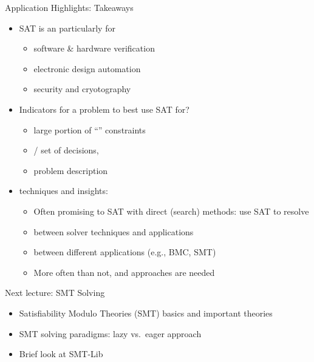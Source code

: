 \documentclass[t,english]{sdqbeamer}
\begin{document}
\begin{frame}{Application Highlights: Takeaways}
	\vspace*{-7mm}
	\begin{itemize}\setlength{\itemsep}{1ex}
		\item SAT is an  particularly for
		\begin{itemize}
			\item software \& hardware verification
			\item electronic design automation
			\item security and cryotography
		\end{itemize}
		\item Indicators for a problem to best use SAT for?
		\begin{itemize}
			\item large portion of ``'' constraints
			\item {} / set of decisions, 
			\item problem description 
		\end{itemize}
		\item {} techniques and insights:
		\begin{itemize}
			\item Often promising to  SAT with direct (search) methods: use SAT to resolve 
			\item {} between solver techniques and applications
			\item {} between different applications (e.g., BMC, SMT)
			\item More often than not,  and  approaches are needed
		\end{itemize}
	\end{itemize}
	
	\vspace*{4mm}
	\begin{blueblock}{Next lecture: SMT Solving}
		\begin{itemize}
			\item Satisfiability Modulo Theories (SMT) basics and important theories
			\item SMT solving paradigms: lazy vs.~eager approach
			\item Brief look at SMT-Lib
		\end{itemize}
	\end{blueblock}
\end{frame}
\end{document}
